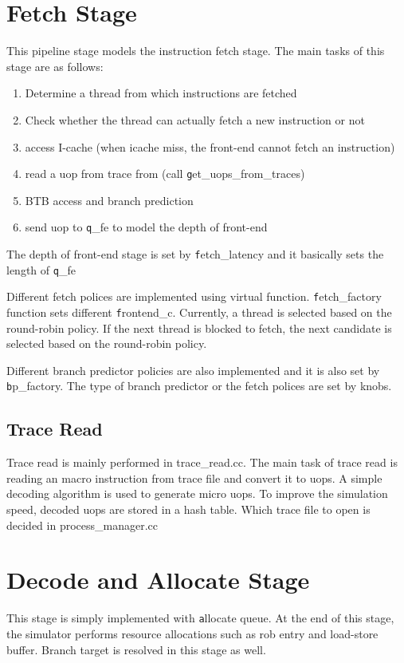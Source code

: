 \section{Fetch Stage}
This pipeline stage models the instruction fetch stage. The main tasks
of this stage are as follows:

\begin{enumerate}
\item Determine a thread from which instructions are fetched 
\item Check whether the thread can actually fetch a new instruction or not  
\item access I-cache  (when icache miss, the front-end cannot fetch an instruction) 
\item read a uop from trace from (call {\texttt get\_uops\_from\_traces})
\item BTB access and branch prediction 
\item send uop to {\texttt q\_fe} to model the depth of front-end 
\end{enumerate}
The depth of front-end stage is set by {\texttt fetch\_latency} and it basically sets the length of 
{\texttt q\_fe  }

Different fetch polices are implemented using virtual function. {\texttt fetch\_factory} function sets 
different {\texttt frontend\_c}. Currently, a thread is selected based on the round-robin policy. If the next thread is blocked to fetch, the next candidate is selected based on the round-robin policy. 

 Different branch predictor policies are also implemented and it is also set by {\texttt bp\_factory}. The type of branch predictor or the fetch polices are set by knobs. 



\subsection{Trace Read} 
Trace read is mainly performed in trace\_read.cc. 
The main task of trace read is reading an macro instruction from trace file and convert it to uops. 
A simple decoding algorithm is used to generate micro uops. 
To improve the simulation speed, decoded uops are stored in a hash table. 
Which trace file to open is decided in process\_manager.cc 



\section{Decode and  Allocate Stage }
This stage is simply implemented with {\texttt  allocate queue}.
At the end of this stage,  the simulator performs resource allocations such as rob entry and load-store buffer. 
Branch target is resolved in this stage as well. 

